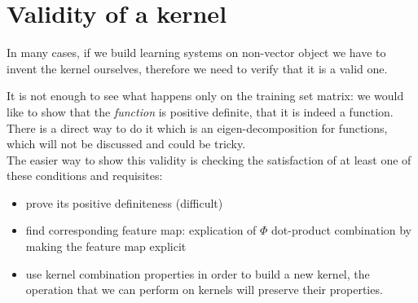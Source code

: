 \section{Validity of a kernel}
    In many cases, if we build learning systems on non-vector object we have to invent the kernel ourselves, therefore we need to verify that it is a valid one. 
    
    
    
    It is not enough to see what happens only on the training set matrix: we would like to show that the \textit{function} is positive definite, that it is indeed a function.
    There is a direct way to do it which is an eigen-decomposition for functions, which will not be discussed and could be tricky.\\
    
    The easier way to show this validity is checking the satisfaction of at least one of these conditions and requisites:
    \begin{itemize}
        \item prove its positive definiteness (difficult)
        \item find corresponding feature map: explication of $\Phi$ dot-product combination by making the feature map explicit
        \item use kernel combination properties in order to build a new kernel, the operation that we can perform on kernels will preserve their properties.
    \end{itemize}

